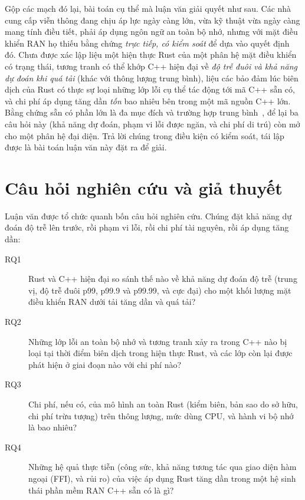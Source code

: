 Gộp các mạch đó lại, bài toán cụ thể mà luận văn giải quyết như sau. Các nhà cung cấp viễn
thông đang chịu áp lực ngày càng lớn, vừa kỹ thuật vừa ngày càng mang tính điều tiết, phải áp
dụng ngôn ngữ an toàn bộ nhớ, nhưng với mặt điều khiển RAN họ thiếu bằng chứng \emph{trực tiếp,
có kiểm soát} để dựa vào quyết định đó. Chưa được xác lập liệu một hiện thực Rust của một phân
hệ mặt điều khiển có trạng thái, tương tranh có thể khớp C++ hiện đại về \emph{độ trễ đuôi và
khả năng dự đoán khi quá tải} (khác với thông lượng trung bình), liệu các bảo đảm lúc biên
dịch của Rust có thực sự loại những lớp lỗi cụ thể tác động tới mã C++ sẵn có, và chi phí áp
dụng tăng dần \emph{tốn} bao nhiêu bên trong một mã nguồn C++ lớn. Bằng chứng sẵn có phần lớn
là đa mục đích và trường hợp trung
bình~\cite{balasubramanian2017rust,qin2020rust}, để lại ba câu hỏi này (khả năng dự đoán, phạm
vi lỗi được ngăn, và chi phí di trú) còn mở cho một phân hệ đại diện. Trả lời chúng trong điều
kiện có kiểm soát, tái lập được là bài toán luận văn này đặt ra để giải.

\section{Câu hỏi nghiên cứu và giả thuyết}\label{sec:rqs}
Luận văn được tổ chức quanh bốn câu hỏi nghiên cứu. Chúng đặt khả năng dự đoán độ trễ lên
trước, rồi phạm vi lỗi, rồi chi phí tài nguyên, rồi áp dụng tăng dần:

\begin{description}
  \item[RQ1] Rust và C++ hiện đại so sánh thế nào về khả năng dự đoán độ trễ (trung vị, độ trễ
        đuôi p99, p99.9 và p99.99, và cực đại) cho một khối lượng mặt điều khiển RAN dưới tải
        tăng dần và quá tải?
  \item[RQ2] Những lớp lỗi an toàn bộ nhớ và tương tranh xảy ra trong C++ nào bị loại tại thời
        điểm biên dịch trong hiện thực Rust, và các lớp còn lại được phát hiện ở giai đoạn nào
        với chi phí nào?
  \item[RQ3] Chi phí, nếu có, của mô hình an toàn Rust (kiểm biên, bản sao do sở hữu, chi phí
        trừu tượng) trên thông lượng, mức dùng CPU, và hành vi bộ nhớ là bao nhiêu?
  \item[RQ4] Những hệ quả thực tiễn (công sức, khả năng tương tác qua giao diện hàm ngoại
        (FFI), và rủi ro) của việc áp dụng Rust tăng dần trong một hệ sinh thái phần mềm RAN
        C++ sẵn có là gì?
\end{description}

